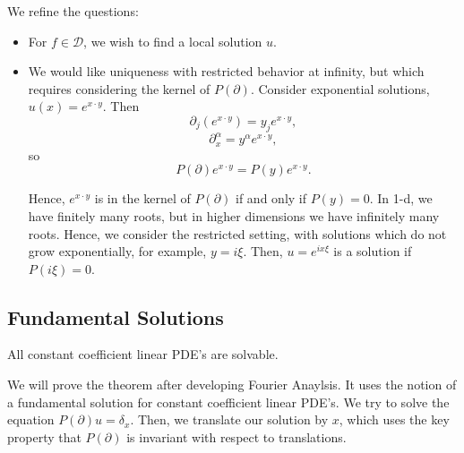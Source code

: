 \documentclass[12pt]{scrartcl}
\begin{document}
We refine the questions:
\begin{itemize}
\item For $f \in \mathcal D$, we wish to find a local solution $u$.  
\item We would like uniqueness with restricted behavior at infinity, but which requires considering the kernel of $P(\partial)$.  Consider exponential solutions, $u(x) = e^{x\cdot y}$.  Then $$\partial_j(e^{x\cdot y}) = y_je^{x \cdot y}, $$ $$\partial_x^{\alpha} = y^{\alpha}e^{x \cdot y},$$
so $$P(\partial)e^{x \cdot y} = P(y)e^{x \cdot y}.$$

Hence, $e^{x \cdot y}$ is in the kernel of $P(\partial)$ if and only if $P(y) = 0.$  In 1-d, we have finitely many roots, but in higher dimensions we have infinitely many roots.  Hence, we consider the restricted setting, with solutions which do not grow exponentially, for example, $y = i\xi$.  Then, $u = e^{ix\xi}$ is a solution if $P(i \xi) = 0$.

\end{itemize}
\subsection{Fundamental Solutions}
\begin{thm} All constant coefficient linear PDE's are solvable.
\end{thm}
We will prove the theorem after developing Fourier Anaylsis.  It uses the notion of a fundamental solution for constant coefficient linear PDE's.  We try to solve the equation $P(\partial)u = \delta_x$.  Then, we translate our solution by $x$, which uses the key property that $P(\partial)$ is invariant with respect to translations.
\end{document}
